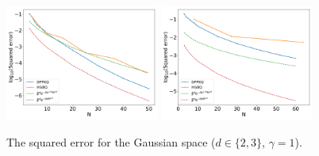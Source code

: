 \documentclass[twoside,11pt]{book}
\numberwithin{theorem}{chapter}
\numberwithin{definition}{chapter}
\numberwithin{proposition}{chapter}
\numberwithin{corollary}{chapter}
\numberwithin{example}{chapter}
\numberwithin{lemma}{chapter}
\numberwithin{assumption}{chapter}
\begin{document}
\begin{figure}[]
    \centering
\includegraphics[width= 0.45\textwidth]{img/neurips/multiHermite/Gaussian_2D_kernel_scale_1_fig_L.pdf}
\includegraphics[width= 0.45\textwidth]{img/neurips/multiHermite/Gaussian_3D_kernel_scale_1_fig_L.pdf} \\
\caption{The squared error for the Gaussian space ($d \in \{2,3\}$, $\gamma=1$). \label{fig:GaussianResult}}
\end{figure}





\end{document}
